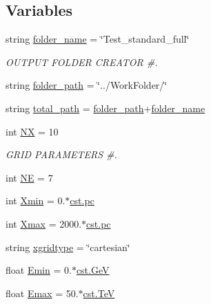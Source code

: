 \subsection*{Variables}
\begin{DoxyCompactItemize}
\item 
string \hyperlink{namespacenamelist_ae4a2b399bbe52993d2d43c55ac29e961}{folder\+\_\+name} = \char`\"{}Test\+\_\+standard\+\_\+full\char`\"{}
\begin{DoxyCompactList}\small\item\em O\+U\+T\+P\+UT F\+O\+L\+D\+ER C\+R\+E\+A\+T\+OR \#. \end{DoxyCompactList}\item 
string \hyperlink{namespacenamelist_a3b503c014a95b4fe0b14a45005ff8270}{folder\+\_\+path} = \char`\"{}../Work\+Folder/\char`\"{}
\item 
string \hyperlink{namespacenamelist_a6c4d0bf6d00b16d29ca1ba57091d5167}{total\+\_\+path} = \hyperlink{namespacenamelist_a3b503c014a95b4fe0b14a45005ff8270}{folder\+\_\+path}+\hyperlink{namespacenamelist_ae4a2b399bbe52993d2d43c55ac29e961}{folder\+\_\+name}
\item 
int \hyperlink{namespacenamelist_ac228fb8e42706311969779d134433edd}{NX} = 10
\begin{DoxyCompactList}\small\item\em G\+R\+ID P\+A\+R\+A\+M\+E\+T\+E\+RS \#. \end{DoxyCompactList}\item 
int \hyperlink{namespacenamelist_a372892989a797e9c3b759f023e878e4d}{NE} = 7
\item 
int \hyperlink{namespacenamelist_a512ba0df866fdbf44bfdd6dab3846aba}{Xmin} = 0.$\ast$\hyperlink{constants_8h_a2884cd030c4c825754349a525a1d06ce}{cst.\+pc}
\item 
int \hyperlink{namespacenamelist_a9b5f75b28f87c2258e7f52b41cabcd8f}{Xmax} = 2000.$\ast$\hyperlink{constants_8h_a2884cd030c4c825754349a525a1d06ce}{cst.\+pc}
\item 
string \hyperlink{namespacenamelist_aa070f33430efb3ee85a15f4c91b8165f}{xgridtype} = \char`\"{}cartesian\char`\"{}
\item 
float \hyperlink{namespacenamelist_ad0f5eea37fb1092519d3ebfe3478ccc1}{Emin} = 0.$\ast$\hyperlink{constants_8h_aec0e126d9991db8ad0b26139f5860568}{cst.\+GeV}
\item 
float \hyperlink{namespacenamelist_a5262c7aab8333b9071ce73b63781ff32}{Emax} = 50.$\ast$\hyperlink{constants_8h_a7f801e1f6821bc6baf0652ed2496e5e9}{cst.\+TeV}
\item 

\end{DoxyCompactItemize}
